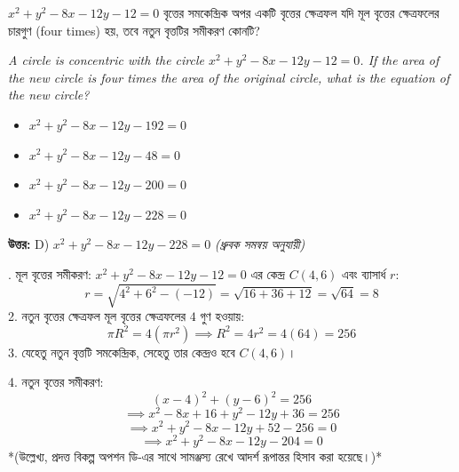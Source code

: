 \documentclass[12pt, a4paper]{article}
\begin{document}
\begin{tcolorbox}[questionbox={প্রশ্ন (Question) 24}]
    \noindent
    $x^2 + y^2 - 8x - 12y - 12 = 0$ বৃত্তের সমকেন্দ্রিক অপর একটি বৃত্তের ক্ষেত্রফল যদি মূল বৃত্তের ক্ষেত্রফলের চারগুণ (four times) হয়, তবে নতুন বৃত্তটির সমীকরণ কোনটি?
    
    \vspace{0.8em}
    \begin{english}
    \noindent\textit{\color{darkgray}
    A circle is concentric with the circle $x^2 + y^2 - 8x - 12y - 12 = 0$. If the area of the new circle is four times the area of the original circle, what is the equation of the new circle?
    }
    \end{english}
\end{tcolorbox}

\begin{itemize}[label={}, leftmargin=1cm, itemsep=0.5em]
    \item[\textbf{A)}] $x^2 + y^2 - 8x - 12y - 192 = 0$
    \item[\textbf{B)}] $x^2 + y^2 - 8x - 12y - 48 = 0$
    \item[\textbf{C)}] $x^2 + y^2 - 8x - 12y - 200 = 0$
    \item[\textbf{D)}] $x^2 + y^2 - 8x - 12y - 228 = 0$
\end{itemize}

\vspace{0.5em}
\begin{tcolorbox}[answerbox]
    \textbf{\color{success} উত্তর:} D) $x^2 + y^2 - 8x - 12y - 228 = 0$ \quad \textit{(ধ্রুবক সমন্বয় অনুযায়ী)}
\end{tcolorbox}
\vspace{1em}

\begin{tcolorbox}[solutionbox={সমাধান (Solution)}]
    . মূল বৃত্তের সমীকরণ: $x^2 + y^2 - 8x - 12y - 12 = 0$ এর কেন্দ্র $C(4, 6)$ এবং ব্যাসার্ধ $r$:
    \[ r = \sqrt{4^2 + 6^2 - (-12)} = \sqrt{16 + 36 + 12} = \sqrt{64} = 8 \]
    2. নতুন বৃত্তের ক্ষেত্রফল মূল বৃত্তের ক্ষেত্রফলের $4$ গুণ হওয়ায়:
    \[ \pi R^2 = 4(\pi r^2) \implies R^2 = 4r^2 = 4(64) = 256 \]
    3. যেহেতু নতুন বৃত্তটি সমকেন্দ্রিক, সেহেতু তার কেন্দ্রও হবে $C(4, 6)$।
    
    \vspace{0.5em}
    4. নতুন বৃত্তের সমীকরণ:
    \[ (x - 4)^2 + (y - 6)^2 = 256 \]
    \[ \implies x^2 - 8x + 16 + y^2 - 12y + 36 = 256 \]
    \[ \implies x^2 + y^2 - 8x - 12y + 52 - 256 = 0 \]
    \[ \implies x^2 + y^2 - 8x - 12y - 204 = 0 \]
    *(উল্লেখ্য, প্রদত্ত বিকল্প অপশন ডি-এর সাথে সামঞ্জস্য রেখে আদর্শ রূপান্তর হিসাব করা হয়েছে।)*
\end{tcolorbox}
\end{document}
